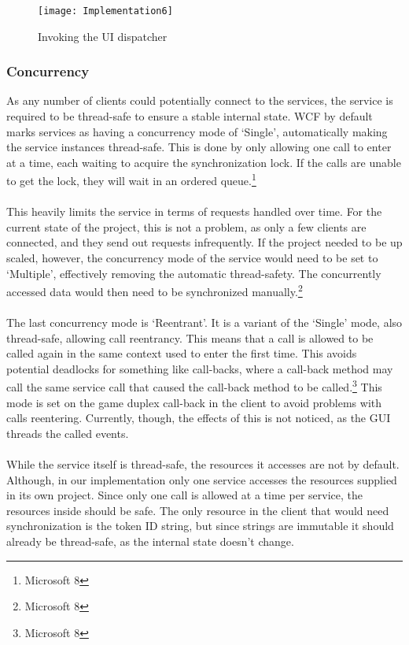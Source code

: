 \begin{figure}[h]
\centerline{\texttt{[image: Implementation6]}}
\caption {Invoking the UI dispatcher}
\label {fig:implementation6}
\end{figure}

\subsubsection {Concurrency}
As any number of clients could potentially connect to the services, the
service is required to be thread-safe to ensure a stable internal state.
WCF by default marks services as having a concurrency mode of ‘Single’,
 automatically making the service instances thread-safe. This is done by
  only allowing one call to enter at a time, each waiting to acquire the
  synchronization lock. If the calls are unable to get the lock, they will
   wait in an ordered queue.\footnote{Microsoft 8}
\\\\
This heavily limits the service in terms of requests handled over time. For
 the current state of the project, this is not a problem, as only a few
  clients are connected, and they send out requests infrequently. If the
  project needed to be up scaled, however, the concurrency mode of the
  service would need to be set to ‘Multiple’, effectively removing the
  automatic thread-safety. The concurrently accessed data would then
   need to be synchronized manually.\footnote{Microsoft 8}
\\\\
The last concurrency mode is ‘Reentrant’. It is a variant of the ‘Single’
 mode, also thread-safe, allowing call reentrancy. This means that a call
 is allowed to be called again in the same context used to enter the first
 time. This avoids potential deadlocks for something like call-backs, where
  a call-back method may call the same service call that caused the call-back
   method to be called.\footnote{Microsoft 8} This mode is set on the game
   duplex call-back in the client to avoid problems with calls reentering.
   Currently, though, the effects of this is not noticed, as the GUI threads
    the called events.
\\\\
While the service itself is thread-safe, the resources it accesses are not by
 default. Although, in our implementation only one service accesses the
 resources supplied in its own project. Since only one call is allowed at a
  time per service, the resources inside should be safe. The only resource
  in the client that would need synchronization is the token ID string, but
   since strings are immutable it should already be thread-safe, as the
    internal state doesn’t change.

